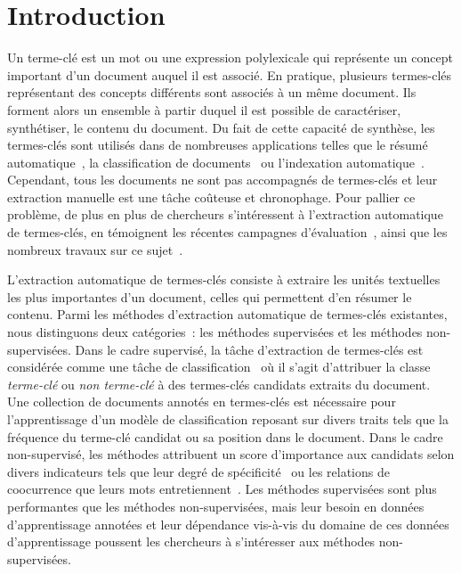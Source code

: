 \section{Introduction}
\label{sec:introduction}
  Un terme-clé est un mot ou une expression polylexicale qui représente un
  concept important d'un document auquel il est associé. En pratique, plusieurs
  termes-clés représentant des concepts différents sont associés à un même
  document. Ils forment alors un ensemble à partir duquel il est
  possible de caractériser, synthétiser, le contenu du document. Du
  fait de cette capacité de synthèse, les termes-clés sont utilisés dans de
  nombreuses applications telles que le résumé
  automatique~\cite{avanzo2005keyphrase}, la classification de
  documents~\cite{han2007webdocumentclustering} ou l'indexation
  automatique~\cite{medelyan2008smalltrainingset}. Cependant, tous les documents
  ne sont pas accompagnés de termes-clés et leur extraction manuelle est une
  tâche coûteuse et chronophage.
  Pour pallier ce problème, de plus en plus
  de chercheurs s'intéressent à l'extraction automatique de termes-clés, en
  témoignent les récentes campagnes
  d'évaluation~\cite{paroubek2012deft,kim2010semeval}, ainsi que les nombreux
  travaux sur ce sujet~\cite{hasan2014state_of_the_art}.

  L'extraction automatique de termes-clés consiste à extraire les unités
  textuelles les plus importantes d'un document, celles qui permettent d'en
  résumer le contenu. Parmi les méthodes d'extraction
  automatique de termes-clés existantes, nous distinguons deux catégories~: les
  méthodes supervisées et les méthodes non-supervisées. Dans le cadre supervisé,
  la tâche d'extraction de termes-clés est considérée comme une tâche de
  classification~\cite{witten1999kea} où il s'agit d'attribuer la classe
  \og{}\textit{terme-clé}\fg{} ou \og{}\textit{non terme-clé}\fg{} à des
  termes-clés candidats extraits du document. Une collection de documents
  annotés en termes-clés est nécessaire pour l'apprentissage d'un modèle de
  classification reposant sur divers traits tels que la fréquence du terme-clé
  candidat ou sa position dans le document. Dans le cadre non-supervisé, les
  méthodes attribuent un score d'importance aux candidats selon divers
  indicateurs tels que leur degré de spécificité~\cite{paukkeri2010likey} ou les relations de coocurrence que leurs
  mots entretiennent~\cite{mihalcea2004textrank}. Les méthodes supervisées sont
  plus performantes que les méthodes non-supervisées, mais leur besoin en
  données d'apprentissage annotées et leur dépendance vis-à-vis du domaine de
  ces données d'apprentissage poussent les
  chercheurs à s'intéresser aux méthodes non-supervisées.

